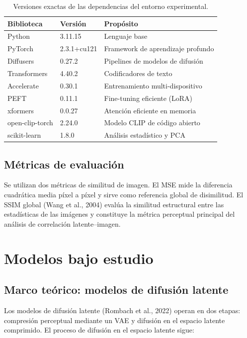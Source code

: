 \documentclass[12pt, a4paper, twoside]{book}
\begin{document}
\begin{table}[htb]
\centering
\caption{Versiones exactas de las dependencias del entorno experimental.}
\label{tab:software}
\small
\begin{tabular}{lll}
\toprule
\textbf{Biblioteca} & \textbf{Versión} & \textbf{Propósito} \\
\midrule
Python       & 3.11.15       & Lenguaje base \\
PyTorch      & 2.3.1+cu121   & Framework de aprendizaje profundo \\
Diffusers    & 0.27.2        & Pipelines de modelos de difusión \\
Transformers & 4.40.2        & Codificadores de texto \\
Accelerate   & 0.30.1        & Entrenamiento multi-dispositivo \\
PEFT         & 0.11.1        & Fine-tuning eficiente (LoRA) \\
xformers     & 0.0.27        & Atención eficiente en memoria \\
open-clip-torch & 2.24.0    & Modelo CLIP de código abierto \\
scikit-learn & 1.8.0         & Análisis estadístico y PCA \\
\bottomrule
\end{tabular}
\end{table}

\subsection{Métricas de evaluación}

Se utilizan dos métricas de similitud de imagen. El MSE mide la diferencia cuadrática media píxel a píxel y sirve como referencia global de disimilitud. El SSIM global (Wang et al., 2004) evalúa la similitud estructural entre las estadísticas de las imágenes y constituye la métrica perceptual principal del análisis de correlación latente--imagen.

\section{Modelos bajo estudio}
\label{sec:modelos}

\subsection{Marco teórico: modelos de difusión latente}

Los modelos de difusión latente (Rombach et al., 2022) operan en dos etapas: compresión perceptual mediante un VAE y difusión en el espacio latente comprimido. El proceso de difusión en el espacio latente sigue:
\end{document}
